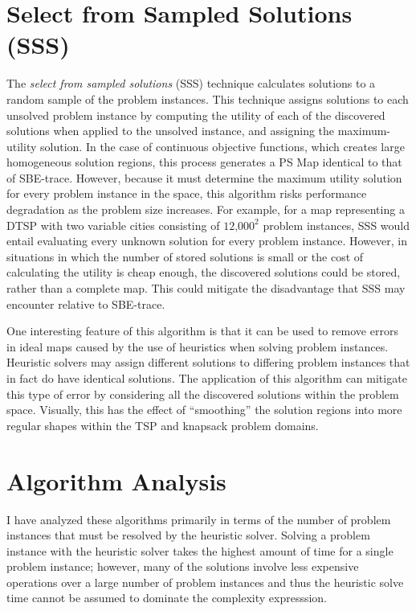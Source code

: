 \section{Select from Sampled Solutions (SSS)}
\label{sec:sss}
The \textit{select from sampled solutions} (SSS) technique calculates solutions to a random sample of the problem instances.  This technique assigns solutions to each unsolved problem instance by computing the utility of each of the discovered solutions when applied to the unsolved instance, and assigning the maximum-utility solution.  In the case of continuous objective functions, which creates large homogeneous solution regions, this process generates a PS Map identical to that of SBE-trace.  However, because it must determine the maximum utility solution for every problem instance in the space, this algorithm risks performance degradation as the problem size increases.  For example, for a map representing a DTSP with two variable cities consisting of $\textrm{12,000}^{\textrm{2}}$ problem instances, SSS would entail evaluating every unknown solution for every problem instance.  However, in situations in which the number of stored solutions is small or the cost of calculating the utility is cheap enough, the discovered solutions could be stored, rather than a complete map.  This could mitigate the disadvantage that SSS may encounter relative to SBE-trace.

One interesting feature of this algorithm is that it can be used to remove errors in ideal maps caused by the use of heuristics when solving problem instances.  Heuristic solvers may assign different solutions to differing problem instances that in fact do have identical solutions. The  application of this algorithm can mitigate this type of error by considering all the discovered solutions within the problem space.  Visually, this has the effect of ``smoothing'' the solution regions into more regular shapes within the TSP and knapsack problem domains.

\section{Algorithm Analysis}
\label{sec:complexity}
I have analyzed these algorithms primarily in terms of the number of problem instances that must be resolved by the heuristic solver.  Solving a problem instance with the heuristic solver takes the highest amount of time for a single problem instance; however, many of the solutions involve less expensive operations over a large number of problem instances and thus the heuristic solve time cannot be assumed to dominate the complexity expresssion.  

